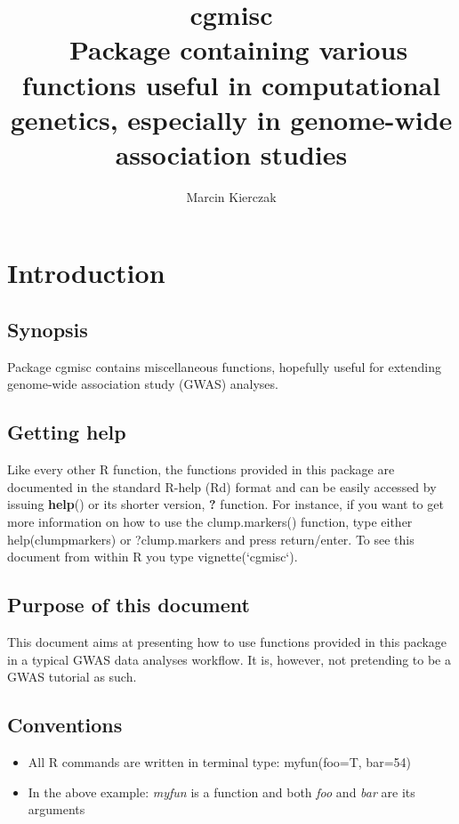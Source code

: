 \documentclass[12pt,a4paper,oneside]{article}
\begin{document}
\title{\color{TealBlue} cgmisc \\\ \normalsize Package containing various functions useful in computational genetics, especially in genome-wide association studies}
\author{\color{Orange}Marcin Kierczak}
\maketitle

\newpage

\section*{Introduction}
\subsection*{Synopsis}
\noindent Package cgmisc contains miscellaneous functions, hopefully useful for extending genome-wide association study (GWAS) analyses.
\subsection*{Getting help}
\noindent Like every other R function, the functions provided in this package are documented in the standard R-help (Rd) format and can be easily accessed by issuing \textbf{help}() or its shorter version, \textbf{?} function. For instance, if you want to get more information on how to use the clump.markers() function, type either help(clumpmarkers) or ?clump.markers and press return/enter. To see this document from within R you type vignette(`cgmisc`).
\subsection*{Purpose of this document}
\noindent This document aims at presenting how to use functions provided in this package in a typical GWAS data analyses workflow. It is, however, not pretending to be a GWAS tutorial as such.
\subsection*{Conventions}
\begin{itemize}
\item{All R commands are written in terminal type: myfun(foo=T, bar=54)}
\item{In the above example: \textit{myfun} is a function and both \textit{foo} and \textit{bar} are its arguments}
\end{itemize}
\end{document}
